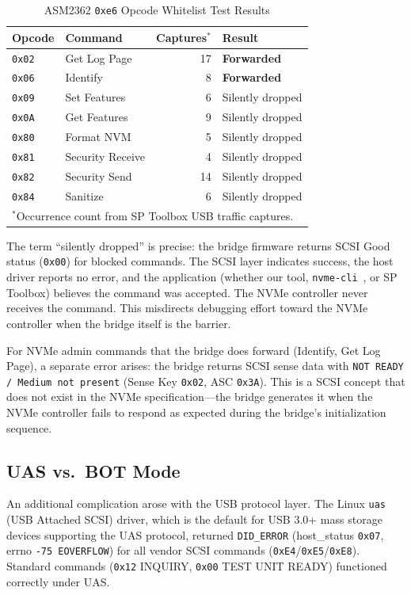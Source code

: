 \documentclass[conference]{IEEEtran}
\begin{document}
\begin{table}[ht]
\centering
\caption{ASM2362 \texttt{0xe6} Opcode Whitelist Test Results}
\label{tab:whitelist}
\begin{tabular}{@{}llrl@{}}
\toprule
Opcode & Command & Captures$^*$ & Result \\
\midrule
\texttt{0x02} & Get Log Page & 17 & \textbf{Forwarded} \\
\texttt{0x06} & Identify & 8 & \textbf{Forwarded} \\
\texttt{0x09} & Set Features & 6 & Silently dropped \\
\texttt{0x0A} & Get Features & 9 & Silently dropped \\
\texttt{0x80} & Format NVM & 5 & Silently dropped \\
\texttt{0x81} & Security Receive & 4 & Silently dropped \\
\texttt{0x82} & Security Send & 14 & Silently dropped \\
\texttt{0x84} & Sanitize & 6 & Silently dropped \\
\bottomrule
\multicolumn{4}{l}{\footnotesize $^*$Occurrence count from SP Toolbox
USB traffic captures.}
\end{tabular}
\end{table}

The term ``silently dropped'' is precise: the bridge firmware returns
SCSI Good status (\texttt{0x00}) for blocked commands. The SCSI layer
indicates success, the host driver reports no error, and the application
(whether our tool, \texttt{nvme-cli}~\cite{nvme-cli}, or SP Toolbox)
believes the command was accepted. The NVMe controller never receives
the command. This misdirects debugging effort toward the NVMe controller
when the bridge itself is the barrier.

For NVMe admin commands that the bridge does forward (Identify, Get Log
Page), a separate error arises: the bridge returns SCSI sense data with
\texttt{NOT READY / Medium not present} (Sense Key \texttt{0x02}, ASC
\texttt{0x3A}). This is a SCSI concept that does not exist in the NVMe
specification---the bridge generates it when the NVMe controller fails
to respond as expected during the bridge's initialization sequence.


\subsection{UAS vs.\ BOT Mode}
\label{sec:uas-bot}

An additional complication arose with the USB protocol layer. The Linux
\texttt{uas} (USB Attached SCSI) driver, which is the default for USB
3.0+ mass storage devices supporting the UAS protocol, returned
\texttt{DID\_ERROR} (host\_status \texttt{0x07}, errno \texttt{-75
EOVERFLOW}) for all vendor SCSI commands
(\texttt{0xE4}/\texttt{0xE5}/\texttt{0xE8}). Standard commands
(\texttt{0x12} INQUIRY, \texttt{0x00} TEST UNIT READY) functioned
correctly under UAS.
\end{document}
